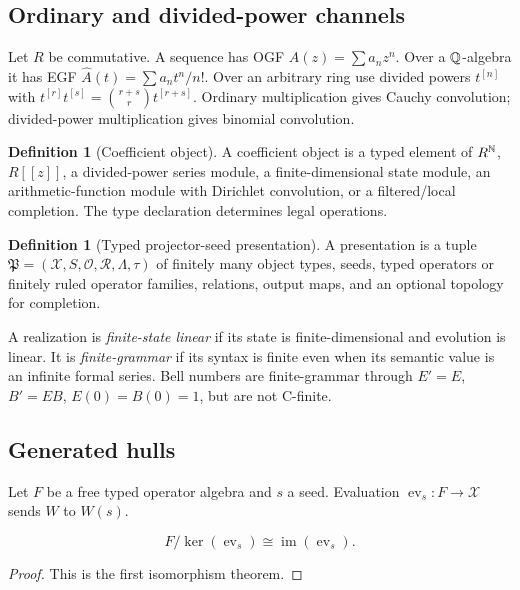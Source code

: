 \documentclass[11pt]{article}
\theoremstyle{definition}\newtheorem{definition}[theorem]{Definition}\newtheorem{example}[theorem]{Example}\newtheorem{construction}[theorem]{Construction}\newtheorem{algorithm}[theorem]{Algorithm}\newtheorem{conjecture}[theorem]{Conjecture}\newtheorem{problem}[theorem]{Problem}
\theoremstyle{remark}\newtheorem{remark}[theorem]{Remark}\newtheorem{boundary}[theorem]{Boundary}\newtheorem{certificate}[theorem]{Computational Certificate}\newtheorem{classical}[theorem]{Classical Input}\newtheorem{principle}[theorem]{Structural Principle}
\begin{document}
\subsection{Ordinary and divided-power channels}
Let $R$ be commutative. A sequence has OGF $A(z)=\sum a_nz^n$. Over a $\mathbb Q$-algebra it has EGF $\widehat A(t)=\sum a_nt^n/n!$. Over an arbitrary ring use divided powers $t^{[n]}$ with $t^{[r]}t^{[s]}=\binom{r+s}{r}t^{[r+s]}$. Ordinary multiplication gives Cauchy convolution; divided-power multiplication gives binomial convolution.
\begin{definition}[Coefficient object]
A coefficient object is a typed element of $R^{\mathbb N}$, $R[[z]]$, a divided-power series module, a finite-dimensional state module, an arithmetic-function module with Dirichlet convolution, or a filtered/local completion. The type declaration determines legal operations.
\end{definition}
\begin{definition}[Typed projector-seed presentation]
A presentation is a tuple $\mathfrak P=(\mathcal X,S,\mathcal O,\mathcal R,\Lambda,\tau)$ of finitely many object types, seeds, typed operators or finitely ruled operator families, relations, output maps, and an optional topology for completion.
\end{definition}
A realization is \emph{finite-state linear} if its state is finite-dimensional and evolution is linear. It is \emph{finite-grammar} if its syntax is finite even when its semantic value is an infinite formal series. Bell numbers are finite-grammar through $E'=E$, $B'=EB$, $E(0)=B(0)=1$, but are not C-finite.
\subsection{Generated hulls}
Let $F$ be a free typed operator algebra and $s$ a seed. Evaluation $\operatorname{ev}_s:F\to\mathcal X$ sends $W$ to $W(s)$.
\begin{proposition}
\[\boxed{F/\ker(\operatorname{ev}_s)\cong\operatorname{im}(\operatorname{ev}_s).}\]
\end{proposition}
\begin{proof}This is the first isomorphism theorem.\end{proof}
\end{document}
